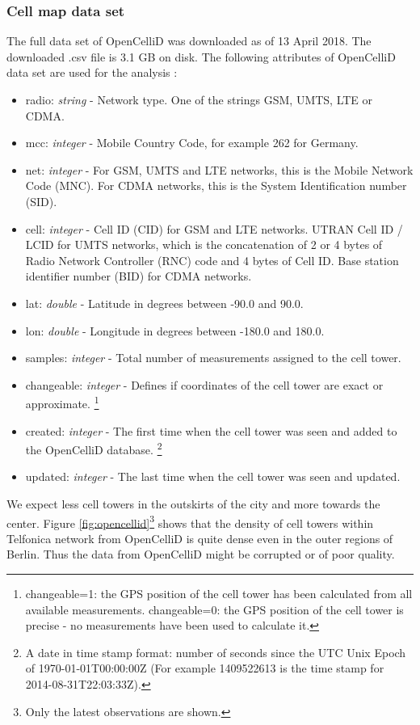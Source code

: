 \subsubsection{Cell map data set}
The full data set of OpenCelliD was downloaded as of 13 April 2018. The downloaded .csv file is 3.1 GB on disk. The following attributes of OpenCelliD data set are used for the analysis \cite{opencellid}:
\begin{itemize}
\item radio: \textit{string} - Network type. One of the strings GSM, UMTS, LTE or CDMA.
\item mcc:  \textit{integer}  -  Mobile Country Code, for example 262 for Germany.
\item net: \textit{integer} - For GSM, UMTS and LTE networks, this is the Mobile Network Code (MNC). For CDMA networks, this is the System Identification number (SID).
\item cell: \textit{integer} - Cell ID (CID) for GSM and LTE networks. UTRAN Cell ID / LCID for UMTS networks, which is the concatenation of 2 or 4 bytes of Radio Network Controller (RNC) code and 4 bytes of Cell ID. Base station identifier number (BID) for CDMA networks.
\item lat: \textit{double} - Latitude in degrees between -90.0 and 90.0.
\item lon: \textit{double} - Longitude in degrees between -180.0 and 180.0.
\item samples: \textit{integer} - Total number of measurements assigned to the cell tower.
\item changeable:  \textit{integer} - Defines if coordinates of the cell tower are exact or approximate. \footnote{changeable=1: the GPS position of the cell tower has been calculated from all available measurements. changeable=0: the GPS position of the cell tower is precise - no measurements have been used to calculate it.}
\item created: \textit{integer} - The first time when the cell tower was seen and added to the OpenCelliD database. \footnote{A date in time stamp format: number of seconds since the UTC Unix Epoch of 1970-01-01T00:00:00Z (For example 1409522613 is the time stamp for 2014-08-31T22:03:33Z).}
\item updated: \textit{integer} - The last time when the cell tower was seen and updated.
\end{itemize}

We expect less cell towers in the outskirts of the city and more towards the center. Figure \ref{fig:opencellid}\footnote{Only the latest observations are shown.} shows that the density of cell towers within Telfonica network from OpenCelliD is quite dense even in the outer regions of Berlin. Thus the data from OpenCelliD might be corrupted or of poor quality.

